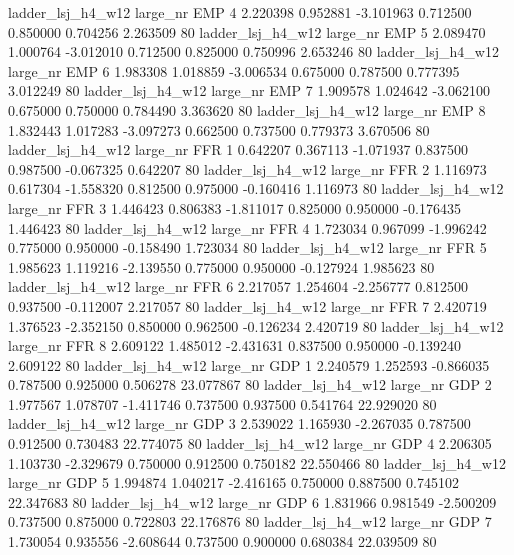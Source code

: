   ladder_lsj_h4_w12   large_nr      EMP                 4  2.220398  0.952881  -3.101963 0.712500 0.850000  0.704256    2.263509 80
  ladder_lsj_h4_w12   large_nr      EMP                 5  2.089470  1.000764  -3.012010 0.712500 0.825000  0.750996    2.653246 80
  ladder_lsj_h4_w12   large_nr      EMP                 6  1.983308  1.018859  -3.006534 0.675000 0.787500  0.777395    3.012249 80
  ladder_lsj_h4_w12   large_nr      EMP                 7  1.909578  1.024642  -3.062100 0.675000 0.750000  0.784490    3.363620 80
  ladder_lsj_h4_w12   large_nr      EMP                 8  1.832443  1.017283  -3.097273 0.662500 0.737500  0.779373    3.670506 80
  ladder_lsj_h4_w12   large_nr      FFR                 1  0.642207  0.367113  -1.071937 0.837500 0.987500 -0.067325    0.642207 80
  ladder_lsj_h4_w12   large_nr      FFR                 2  1.116973  0.617304  -1.558320 0.812500 0.975000 -0.160416    1.116973 80
  ladder_lsj_h4_w12   large_nr      FFR                 3  1.446423  0.806383  -1.811017 0.825000 0.950000 -0.176435    1.446423 80
  ladder_lsj_h4_w12   large_nr      FFR                 4  1.723034  0.967099  -1.996242 0.775000 0.950000 -0.158490    1.723034 80
  ladder_lsj_h4_w12   large_nr      FFR                 5  1.985623  1.119216  -2.139550 0.775000 0.950000 -0.127924    1.985623 80
  ladder_lsj_h4_w12   large_nr      FFR                 6  2.217057  1.254604  -2.256777 0.812500 0.937500 -0.112007    2.217057 80
  ladder_lsj_h4_w12   large_nr      FFR                 7  2.420719  1.376523  -2.352150 0.850000 0.962500 -0.126234    2.420719 80
  ladder_lsj_h4_w12   large_nr      FFR                 8  2.609122  1.485012  -2.431631 0.837500 0.950000 -0.139240    2.609122 80
  ladder_lsj_h4_w12   large_nr      GDP                 1  2.240579  1.252593  -0.866035 0.787500 0.925000  0.506278   23.077867 80
  ladder_lsj_h4_w12   large_nr      GDP                 2  1.977567  1.078707  -1.411746 0.737500 0.937500  0.541764   22.929020 80
  ladder_lsj_h4_w12   large_nr      GDP                 3  2.539022  1.165930  -2.267035 0.787500 0.912500  0.730483   22.774075 80
  ladder_lsj_h4_w12   large_nr      GDP                 4  2.206305  1.103730  -2.329679 0.750000 0.912500  0.750182   22.550466 80
  ladder_lsj_h4_w12   large_nr      GDP                 5  1.994874  1.040217  -2.416165 0.750000 0.887500  0.745102   22.347683 80
  ladder_lsj_h4_w12   large_nr      GDP                 6  1.831966  0.981549  -2.500209 0.737500 0.875000  0.722803   22.176876 80
  ladder_lsj_h4_w12   large_nr      GDP                 7  1.730054  0.935556  -2.608644 0.737500 0.900000  0.680384   22.039509 80
